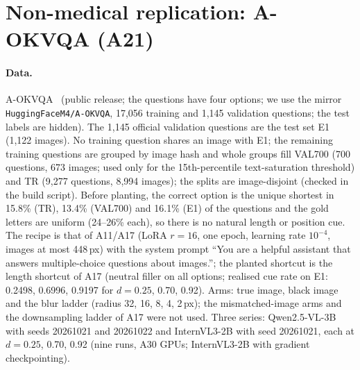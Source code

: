 
\section{Non-medical replication: A-OKVQA (A21)}
\label{app:a21}

\paragraph{Data.}
A-OKVQA~\cite{schwenk2022aokvqa} (public release; the questions have four options; we use the mirror \texttt{HuggingFaceM4/A-OKVQA}, 17{,}056 training and 1{,}145 validation questions; the test labels are hidden).
The 1{,}145 official validation questions are the test set E1 (1{,}122 images).
No training question shares an image with E1; the remaining training questions are grouped by image hash and whole groups fill VAL700 (700 questions, 673 images; used only for the 15th-percentile text-saturation threshold) and TR (9{,}277 questions, 8{,}994 images); the splits are image-disjoint (checked in the build script).
Before planting, the correct option is the unique shortest in 15.8\% (TR), 13.4\% (VAL700) and 16.1\% (E1) of the questions and the gold letters are uniform (24--26\% each), so there is no natural length or position cue.
The recipe is that of A11/A17 (LoRA $r=16$, one epoch, learning rate $10^{-4}$, images at most 448\,px) with the system prompt ``You are a helpful assistant that answers multiple-choice questions about images.''; the planted shortcut is the length shortcut of A17 (neutral filler on all options; realised cue rate on E1: 0.2498, 0.6996, 0.9197 for $d=0.25$, 0.70, 0.92).
Arms: true image, black image and the blur ladder (radius 32, 16, 8, 4, 2\,px); the mismatched-image arms and the downsampling ladder of A17 were not used.
Three series: Qwen2.5-VL-3B with seeds 20261021 and 20261022 and InternVL3-2B with seed 20261021, each at $d=0.25$, 0.70, 0.92 (nine runs, A30 GPUs; InternVL3-2B with gradient checkpointing).

